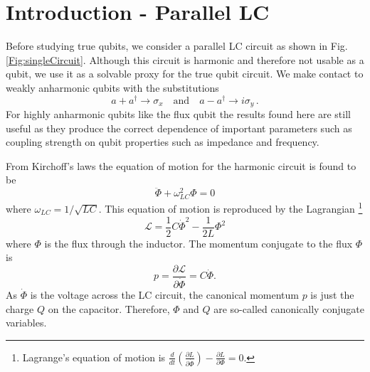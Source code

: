 \section{Introduction - Parallel LC}

Before studying true qubits, we consider a parallel LC circuit as shown in Fig.\,\ref{Fig:singleCircuit}.
Although this circuit is harmonic and therefore not usable as a qubit, we use it as a solvable proxy for the true qubit circuit.
We make contact to weakly anharmonic qubits with the substitutions
\begin{equation}
a+a^\dagger \rightarrow \sigma_x \quad \textrm{and} \quad a-a^\dagger \rightarrow i \sigma_y \, .
\end{equation}
For highly anharmonic qubits like the flux qubit the results found here are still useful as they produce the correct dependence of important parameters such as coupling strength on qubit properties such as impedance and frequency.

From Kirchoff's laws the equation of motion for the harmonic circuit is found to be \begin{equation}
\ddot{\Phi} + \omega_{LC}^2 \Phi = 0 \end{equation}
where $\omega_{LC}=1/\sqrt{LC}$. This equation of motion is reproduced by the Lagrangian \footnote{Lagrange's equation of motion is $\frac{d}{dt}\left( \frac{\partial L}{\partial \dot{\Phi}} \right) - \frac{\partial L}{\partial \Phi} = 0$.} \begin{equation}
\mathcal{L} = \frac{1}{2}C\dot{\Phi}^2 - \frac{1}{2L}\Phi^2 \end{equation}
where $\Phi$ is the flux through the inductor. The momentum conjugate to the flux $\Phi$ is \begin{equation}
p = \frac{\partial \mathcal{L}}{\partial \dot{\Phi}} = C\dot{\Phi}. \end{equation}
As $\dot{\Phi}$ is the voltage across the LC circuit, the canonical momentum $p$ is just the charge $Q$ on the capacitor.
Therefore, $\Phi$ and $Q$ are so-called canonically conjugate variables.

